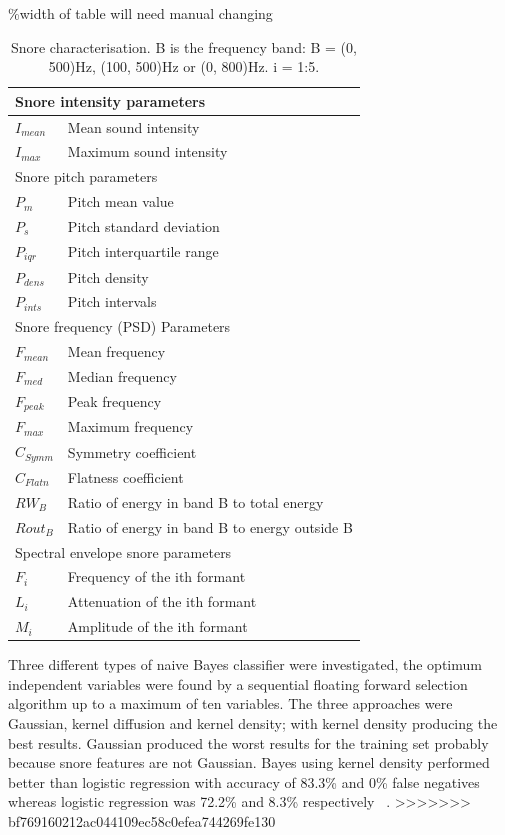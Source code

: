 \begin{table}
\%width of table will need manual changing
\centering
\begin{tabular}{l l}
\toprule
\multicolumn{2}{l}{Snore intensity parameters}\\ \midrule
$I_{mean}$&Mean sound intensity\\ 
$I_{max}$&Maximum sound intensity\\ 
\multicolumn{2}{l}{Snore pitch parameters}\\ 
$P_{m}$&Pitch mean value\\ 
$P_{s}$&Pitch standard deviation\\ 
$P_{iqr}$&Pitch interquartile range\\ 
$P_{dens}$&Pitch density\\ 
$P_{ints}$&Pitch intervals\\ 
\multicolumn{2}{l}{Snore frequency (PSD) Parameters}\\ 
$F_{mean}$&Mean frequency\\ 
$F_{med}$&Median frequency\\ 
$F_{peak}$&Peak frequency\\ 
$F_{max}$&Maximum frequency\\ 
$C_{Symm}$&Symmetry coefficient\\ 
$C_{Flatn}$&Flatness coefficient\\ 
$RW_{B}$&Ratio of energy in band B to total energy\\ 
$Rout_{B}$&Ratio of energy in band B to energy outside B\\ 
\multicolumn{2}{l}{Spectral envelope snore parameters}\\ 
$F_{i}$&Frequency of the ith formant\\ 
$L_{i}$&Attenuation of the ith formant\\ 
$M_{i}$&Amplitude of the ith formant\\ \bottomrule
\end{tabular}
\caption{Snore characterisation. B is the frequency band: B = (0, 500)Hz, (100, 500)Hz or (0, 800)Hz. i = 1:5.}
\label{table:sola2012}
\end{table}
Three different types of naive Bayes classifier were investigated, the optimum independent variables were found by a sequential floating forward selection algorithm up to a maximum of ten variables. The three approaches were Gaussian, kernel diffusion and kernel density; with kernel density producing the best results. Gaussian produced the worst results for the training set probably because snore features are not Gaussian. Bayes using kernel density performed better than logistic regression with accuracy of 83.3\% and 0\% false negatives whereas logistic regression was 72.2\% and 8.3\% respectively ~\cite{sola2012multiclass}.
>>>>>>> bf769160212ac044109ec58c0efea744269fe130
